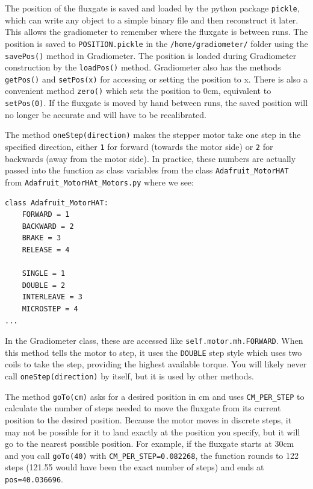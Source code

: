\documentclass{TheMartianReport}
\newcommand{\pyinline}[1]{\texttt{#1}}
\newcommand{\shellinline}[1]{\texttt{#1}}
\begin{document}
The position of the fluxgate is saved and loaded by the python package \pyinline{pickle}, which can write any object to a simple binary file and then reconstruct it later. This allows the gradiometer to remember where the fluxgate is between runs. The position is saved to \shellinline{POSITION.pickle} in the \shellinline{/home/gradiometer/} folder using the \pyinline{savePos()} method in Gradiometer. The position is loaded during Gradiometer construction by the \pyinline{loadPos()} method. Gradiometer also has the methods \pyinline{getPos()} and \pyinline{setPos(x)} for accessing or setting the position to x. There is also a convenient method \pyinline{zero()} which sets the position to 0cm, equivalent to \pyinline{setPos(0)}. If the fluxgate is moved by hand between runs, the saved position will no longer be accurate and will have to be recalibrated.

The method \pyinline{oneStep(direction)} makes the stepper motor take one step in the specified direction, either \pyinline{1} for forward (towards the motor side) or \pyinline{2} for backwards (away from the motor side). In practice, these numbers are actually passed into the function as class variables from the class \pyinline{Adafruit_MotorHAT} from \shellinline{Adafruit_MotorHAt_Motors.py} where we see:

\begin{verbatim}
class Adafruit_MotorHAT:
    FORWARD = 1
    BACKWARD = 2
    BRAKE = 3
    RELEASE = 4

    SINGLE = 1
    DOUBLE = 2
    INTERLEAVE = 3
    MICROSTEP = 4
...
\end{verbatim}
In the Gradiometer class, these are accessed like \pyinline{self.motor.mh.FORWARD}. When this method tells the motor to step, it uses the \pyinline{DOUBLE} step style which uses two coils to take the step, providing the highest available torque. You will likely never call \pyinline{oneStep(direction)} by itself, but it is used by other methods.

The method \pyinline{goTo(cm)} asks for a desired position in cm and uses \pyinline{CM_PER_STEP} to calculate the number of steps needed to move the fluxgate from its current position to the desired position. Because the motor moves in discrete steps, it may not be possible for it to land exactly at the position you specify, but it will go to the nearest possible position. For example, if the fluxgate starts at 30cm and you call \pyinline{goTo(40)} with \pyinline{CM_PER_STEP=0.082268}, the function rounds to 122 steps (121.55 would have been the exact number of steps) and ends at \pyinline{pos=40.036696}. 
\end{document}
